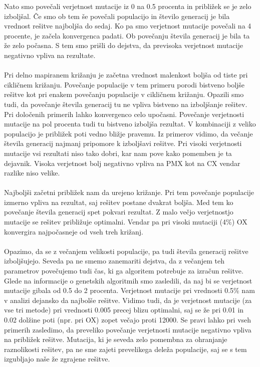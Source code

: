 \documentclass[12pt,a4paper]{amsart}
\theoremstyle{definition} %
\theoremstyle{plain} %
\begin{document}
Nato smo povečali verjetnost mutacije iz 0 na 0.5 procenta in približek se je zelo izboljšal. Če smo ob tem še povečali populacijo in število generacij je bila vrednost rešitve najboljša do sedaj. 
Ko pa smo verjetnost mutacije povečali na 4 procente, je začela konvergenca padati. Ob povečanju števila generacij je bila ta že zelo počasna. 
S tem smo prišli do dejstva, da previsoka verjetnost mutacije negativno vpliva na rezultate. 
\\
\\
Pri delno mapiranem križanju je začetna vrednost malenkost boljša od tiste pri cikličnem križanju. Povečanje populacije v tem primeru porodi bistveno boljše rešitve kot pri enakem povečanju populacije v cikličnem križanju. 
Opazili smo tudi, da povečanje števila generacij tu ne vpliva bistveno na izboljšanje rešitev. Pri določenih primerih lahko konvergenco celo upočasni. 
Povečanje verjetnosti mutacije na pol procenta tudi tu bistveno izboljša rezultat. V kombinaciji z veliko populacijo je približek poti vedno bližje pravemu. 
Iz primerov vidimo, da večanje števila generacij najmanj pripomore k izboljšavi rešitve. 
Pri visoki verjetnosti mutacije vsi rezultati niso tako dobri, kar nam pove kako pomemben je ta dejavnik. Visoka verjetnost bolj negativno vpliva na PMX kot na CX vendar razlike niso velike. 
\\
\\
Najboljši začetni približek nam da urejeno križanje. Pri tem povečanje populacije izmerno vpliva na rezultat, saj rešitev postane dvakrat boljša. 
Med tem ko povečanje števila generacij spet pokvari rezultat. Z malo večjo verjetnostjo mutacije se rešitev približuje optimalni. Vendar pa pri visoki mutaciji (4\%) OX konvergira najpočasneje od vseh treh križanj. 
\\
\\
Opazimo, da se z večanjem velikosti populacije, pa tudi števila generacij rešitve izboljšujejo. Seveda pa ne smemo zanemariti dejstva, da z večanjem teh parametrov povečujemo tudi čas, ki ga algoritem potrebuje za izračun rešitve.  Glede na informacije o genetskih algoritmih smo zasledili, da naj bi se verjetnost mutacije gibala od 0.5 do 2 procenta. Verjetnost mutacije pri vrednosti 0.5\% nam v analizi dejansko da najbolše rešitve. Vidimo tudi, da je verjetnost mutacije (za vse tri metode) pri vrednosti 0.005 precej blizu optimalni, saj se že pri 0.01 in 0.02 dolžine poti (npr. pri OX) zopet večajo proti 12000. Se pravi lahko pri vseh primerih zasledimo, da preveliko povečanje verjetnosti mutacije negativno vpliva na približek rešitve. Mutacija, ki je seveda zelo pomembna za ohranjanje raznolikosti rešitev, pa ne sme zajeti prevelikega deleža populacije, saj se s tem izgubljajo naše že zgrajene rešitve. 
\end{document}
